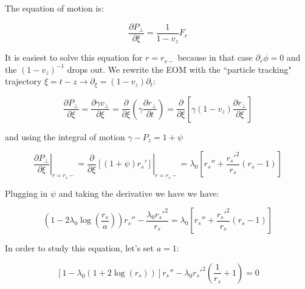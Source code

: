 \documentclass[aps,prl,preprint,groupedaddress]{revtex4-1}
\begin{document}

The equation of motion is: 

\begin{equation}\label{eq:EOM_1}
\frac{\partial P_\perp}{\partial \xi} = \frac{1}{1-v_z} F_r
\end{equation}

It is easiest to solve this equation for $r=r_{s-}$ because in that case $\partial_r \phi = 0$ and the $(1-v_z)^{-1}$ drops out. We rewrite the EOM with the ``particle tracking" trajectory $\xi = t - z \rightarrow \partial_{\xi} = (1-v_z)\partial_t$:

\begin{equation}\label{eq:track}
\frac{\partial P_{\perp}}{\partial \xi} = \frac{\partial \gamma v_{\perp}}{\partial \xi} =  \frac{\partial}{\partial \xi}\left(\gamma \frac{\partial r_{\perp}}{\partial t}\right) = \frac{\partial}{\partial \xi}\left[\gamma (1-v_z)\frac{\partial r_{\perp}}{\partial \xi}\right]
\end{equation}

and using the integral of motion $\gamma - P_z = 1 + \psi$

\begin{equation}\label{eq:EOM_2}
\left. \frac{\partial P_{\perp}}{\partial \xi}\right|_{r=r_s-} = \left. \frac{\partial}{\partial \xi}[(1+\psi)r_s'] \right|_{r=r_s-}= \lambda_0\left[r_s'' +\frac{r_s'^2}{r_s}(r_s-1)\right]
\end{equation}

Plugging in $\psi$ and taking the derivative we have we have:

\begin{equation}\label{eq:rs}
\left(1-2\lambda_0\log\left(\frac{r_s}{a}\right) \right)r_s'' -\frac{\lambda_0 r_s'^2}{r_s} = \lambda_0\left[r_s'' +\frac{r_s'^2}{r_s}(r_s-1)\right]
\end{equation}

In order to study this equation, let's set $a=1$:

\begin{equation}\label{eq:rs_simp}
[1-\lambda_0(1+2\log(r_s))] r_s'' - \lambda_0 r_s'^2\left(\frac{1}{r_s}+1\right) = 0
\end{equation}


\end{document}
